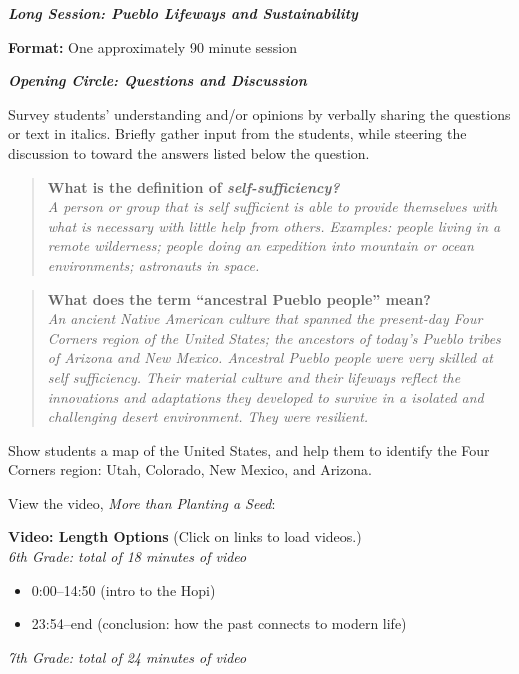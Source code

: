 \documentclass[12pt,]{article}
\providecommand{\tightlist}{%
  \setlength{\itemsep}{0pt}\setlength{\parskip}{0pt}}
\begin{document}
\textbf{\emph{Long Session: Pueblo Lifeways and Sustainability}}

\textbf{Format:} One approximately 90 minute session

\textbf{\emph{Opening Circle: Questions and Discussion}}

Survey students' understanding and/or opinions by verbally sharing the
questions or text in italics. Briefly gather input from the students,
while steering the discussion to toward the answers listed below the
question.

\begin{quote}
\textbf{What is the definition of \emph{self-sufficiency?}}\\
\emph{A person or group that is self sufficient is able to provide
themselves with what is necessary with little help from others.
Examples: people living in a remote wilderness; people doing an
expedition into mountain or ocean environments; astronauts in space.}
\end{quote}

\begin{quote}
\textbf{What does the term ``ancestral Pueblo people'' mean?}\\
\emph{An ancient Native American culture that spanned the present-day Four
Corners region of the United States; the ancestors of today's Pueblo
tribes of Arizona and New Mexico. Ancestral Pueblo people were very
skilled at self sufficiency. Their material culture and their lifeways
reflect the innovations and adaptations they developed to survive in a
isolated and challenging desert environment. They were resilient.}
\end{quote}

Show students a map of the United States, and help them to identify the
Four Corners region: Utah, Colorado, New Mexico, and Arizona.

View the video, \emph{More than Planting a Seed}:

\textbf{Video: Length Options} (Click on links to load videos.)\\
\emph{6th Grade: total of 18 minutes of video}

\begin{itemize}
\tightlist
\item
  0:00--14:50 (intro to the Hopi)
\item
  23:54--end (conclusion: how the past connects to modern life)
\end{itemize}

\emph{7th Grade: total of 24 minutes of video}
\end{document}
